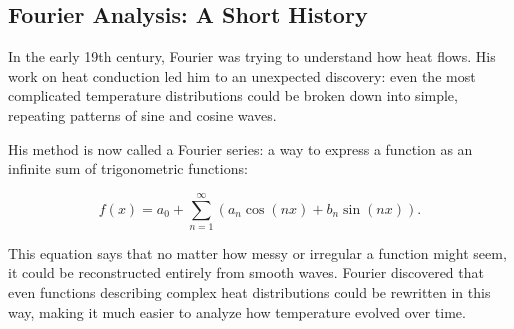 \documentclass{article}
\begin{document}
\subsection{Fourier Analysis: A Short History}

In the early 19th century, Fourier was trying to understand how heat flows. His work on heat conduction led him to an unexpected discovery: even the most complicated temperature distributions could be broken down into simple, repeating patterns of sine and cosine waves. 

His method is now called a Fourier series: a way to express a function as an infinite sum of trigonometric functions:

\[
f(x) = a_0 + \sum_{n=1}^{\infty} \left( a_n \cos(n x) + b_n \sin(n x) \right).
\]

\begin{center}
\end{center}

This equation says that no matter how messy or irregular a function might seem, it could be reconstructed entirely from smooth waves. Fourier discovered that even functions describing complex heat distributions could be rewritten in this way, making it much easier to analyze how temperature evolved over time.
\end{document}
